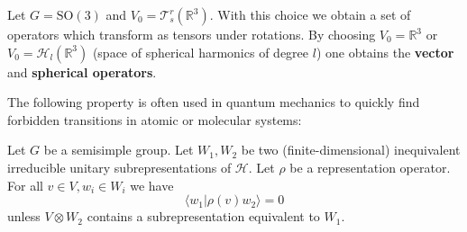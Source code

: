     \begin{example}
        Let $G=\text{SO}(3)$ and $V_0=\mathcal{T}^r_s(\mathbb{R}^3)$. With this choice we obtain a set of operators which transform as tensors under rotations. By choosing $V_0=\mathbb{R}^3$ or $V_0=\mathcal{H}_l(\mathbb{R}^3)$ (space of spherical harmonics of degree $l$) one obtains the \textbf{vector} and \textbf{spherical operators}.
    \end{example}

    The following property is often used in quantum mechanics to quickly find forbidden transitions in atomic or molecular systems:
        \begin{property}
            Let $G$ be a semisimple group. Let $W_1, W_2$ be two (finite-dimensional) inequivalent irreducible unitary subrepresentations of $\mathcal{H}$. Let $\rho$ be a representation operator. For all $v\in V, w_i\in W_i$ we have
            \begin{equation}
                \langle w_1|\rho(v)w_2\rangle = 0
            \end{equation}
            unless $V\otimes W_2$ contains a subrepresentation equivalent to $W_1$.
        \end{property}

